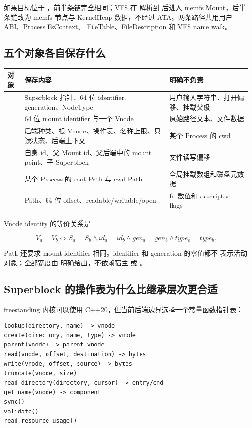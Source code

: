 如果目标位于 ，前半条链完全相同；VFS 在
解析到  后进入 memfs Mount，后半条链改为 memfs 节点与
KernelHeap 数据，不经过 ATA。两条路径共用用户 ABI、Process FsContext、
FileTable、FileDescription 和 VFS name walk。

\subsection{五个对象各自保存什么}

\begin{longtable}{L{0.20\textwidth}L{0.32\textwidth}L{0.36\textwidth}}
\toprule
对象 & 保存内容 & 明确不负责\\
\midrule
{} &
Superblock 指针、64 位 identifier、generation、NodeType &
用户输入字符串、打开偏移、挂载父级\\
 &
64 位 mount identifier 与一个 Vnode &
原始路径文本、文件数据\\
 &
后端种类、根 Vnode、操作表、名称上限、只读状态、后端上下文 &
某个 Process 的 cwd\\
 &
自身 id、父 Mount id、父后端中的 mount point、子 Superblock &
文件读写偏移\\
 &
某个 Process 的 root Path 与 cwd Path &
全局挂载数组和磁盘元数据\\
 &
Path、64 位 offset、readable/writable/open &
fd 数值和 descriptor flags\\
\bottomrule
\end{longtable}

Vnode identity 的等价关系是：

\[
  V_a = V_b \iff
  S_a=S_b \land id_a=id_b \land gen_a=gen_b \land type_a=type_b.
\]

Path 还要求 mount identifier 相同。identifier 和 generation 的零值都不
表示活动对象；全部宽度由  明确给出，不依赖宿主
 或 。

\subsection{Superblock 的操作表为什么比继承层次更合适}

freestanding 内核可以使用 C++20，但当前后端边界选择一个常量函数指针表：

\begin{lstlisting}[caption={BackendOperations 的逻辑接口}]
lookup(directory, name) -> vnode
create(directory, name, type) -> vnode
parent(vnode) -> parent vnode
read(vnode, offset, destination) -> bytes
write(vnode, offset, source) -> bytes
truncate(vnode, size)
read_directory(directory, cursor) -> entry/end
get_name(vnode) -> component
sync()
validate()
read_resource_usage()
\end{lstlisting}

